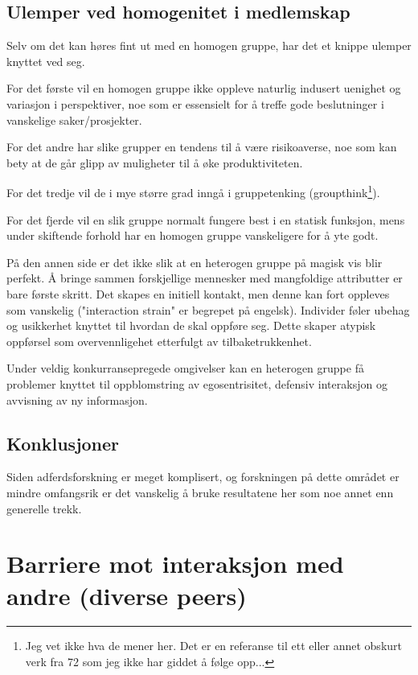 \documentclass[11pt]{article}
\begin{document}
		\subsection{Ulemper ved homogenitet i medlemskap}
			Selv om det kan høres fint ut med en homogen gruppe, har det et knippe ulemper knyttet ved seg. 
			
			For det første vil en homogen gruppe ikke oppleve naturlig indusert uenighet og variasjon i perspektiver, noe som er essensielt for å treffe gode beslutninger i vanskelige saker/prosjekter.
			
			For det andre har slike grupper en tendens til å være risikoaverse, noe som kan bety at de går glipp av muligheter til å øke produktiviteten.
			
			For det tredje vil de i mye større grad inngå i gruppetenking (groupthink\footnote{Jeg vet ikke hva de mener her. Det er en referanse til ett eller annet obskurt verk fra 72 som jeg ikke har giddet å følge opp...}). 
			
			For det fjerde vil en slik gruppe normalt fungere best i en statisk funksjon, mens under skiftende forhold har en homogen gruppe vanskeligere for å yte godt.
			
			På den annen side er det ikke slik at en heterogen gruppe på magisk vis blir perfekt. Å bringe sammen forskjellige mennesker med mangfoldige attributter er bare første skritt. Det skapes en initiell kontakt, men denne kan fort oppleves som vanskelig ("interaction strain" er begrepet på engelsk). Individer føler ubehag og usikkerhet knyttet til hvordan de skal oppføre seg. Dette skaper atypisk oppførsel som overvennligehet etterfulgt av tilbaketrukkenhet.
			
			Under veldig konkurransepregede omgivelser kan en heterogen gruppe få problemer knyttet til oppblomstring av egosentrisitet, defensiv interaksjon og avvisning av ny informasjon.
			
		\subsection{Konklusjoner}
			Siden adferdsforskning er meget komplisert, og forskningen på dette området er mindre omfangsrik er det vanskelig å bruke resultatene her som noe annet enn generelle trekk. 
			
	\section{Barriere mot interaksjon med andre (diverse peers)}
\end{document}
